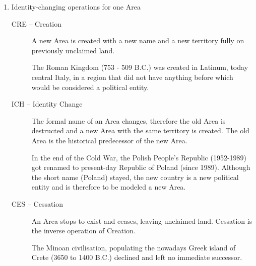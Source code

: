 \begin{enumerate}

  \item Identity-changing operations for one Area
  \begin{description}
    \item[CRE -- Creation]
    A new Area is created with a new name and a new territory fully on previously unclaimed land. \\
    \begin{footnotesize}
      The Roman Kingdom (753 - 509 B.C.) was created in Latinum, today central Italy, in a region that did not have anything before which would be considered a political entity.
    \end{footnotesize}
    \item[ICH -- Identity Change]
    The formal name of an Area changes, therefore the old Area is destructed and a new Area with the same territory is created. The old Area is the historical predecessor of the new Area. \\
    \begin{footnotesize}
      In the end of the Cold War, the Polish People's Republic (1952-1989) got renamed to present-day Republic of Poland (since 1989). Although the short name (Poland) stayed, the new country is a new political entity and is therefore to be modeled a new Area.
    \end{footnotesize}
    \item[CES -- Cessation]
    An Area stops to exist and ceases, leaving unclaimed land. Cessation is the inverse operation of Creation. \\
    \begin{footnotesize}
      The Minoan civilisation, populating the nowadays Greek island of Crete (3650 to 1400 B.C.) declined and left no immediate successor.
    \end{footnotesize}
  \end{description}


\end{enumerate}
